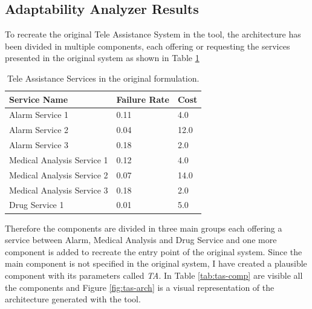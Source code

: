 \clearpage

\subsection{Adaptability Analyzer Results}

To recreate the original Tele Assistance System in the tool, the architecture has been divided in multiple components, each offering or requesting the services presented in the original system as shown in Table \ref{tab:tas-original-services}

\begin{table}[ht!b]
	\centering
	\begin{tabular}{|p{5cm}|p{3cm}|p{3cm}|}
		\hline 
		\textbf{Service Name} & \textbf{Failure Rate} & \textbf{Cost} \\ 
		\hline 
		Alarm Service 1 & 0.11 & 4.0 \\
		\hline 
		Alarm Service 2 & 0.04 & 12.0 \\ 
		\hline 
		Alarm Service 3 & 0.18 & 2.0 \\ 
		\hline 
		Medical Analysis Service 1 & 0.12 & 4.0 \\ 
		\hline
		Medical Analysis Service 2 & 0.07 & 14.0 \\ 
		\hline
		Medical Analysis Service 3 & 0.18 & 2.0 \\ 
		\hline
		Drug Service 1 & 0.01 & 5.0 \\ 
		\hline
		
	\end{tabular} 
	\caption[TAS Services]{Tele Assistance Services in the original formulation.}
	\label{tab:tas-original-services}
\end{table}

Therefore the components are divided in three main groups each offering a service between Alarm, Medical Analysis and Drug Service and one more component is added to recreate the entry point of the original system. Since the main component is not specified in the original system, I have created a plausible component with its parameters called \emph{TA}. In Table \ref{tab:tas-comp} are visible all the components and Figure \ref{fig:tas-arch} is a visual representation of the architecture generated with the tool.

